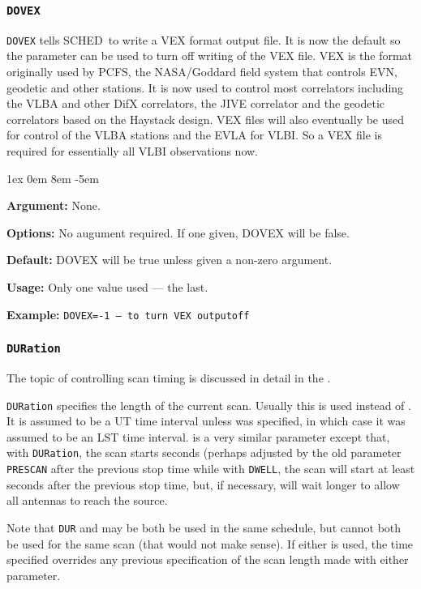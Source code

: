 \documentclass{report}
\newcommand{\schedb}{{\sc SCHED~}}
\newcommand{\rcwbox}[5]{
  \begin{list}{}{\parsep 1ex  \itemsep 0em
                 \leftmargin 8em  \itemindent -5em }
    \item {\bf Argument:} #1
    \item {\bf Options:}  #2
    \item {\bf Default:}  #3
    \item {\bf Usage:}    #4
    \item {\bf Example:}  #5
  \end{list}
}
\begin{document}
\subsubsection{\label{MP:DOVEX}{\tt DOVEX}}

{\tt DOVEX} tells \schedb to write a VEX format output file. It is now
the default so the parameter can be used to turn off writing of the
VEX file.  VEX is the format originally used by PCFS, the NASA/Goddard
field system that controls EVN, geodetic and other stations. It is now
used to control most correlators including the VLBA and other DifX
correlators, the JIVE correlator and the geodetic correlators based on
the Haystack design.  VEX files will also eventually be used for
control of the VLBA stations and the EVLA for VLBI.  So a VEX file is
required for essentially all VLBI observations now.


\rcwbox
{None.}
{No augument required.  If one given, DOVEX will be false.}
{DOVEX will be true unless given a non-zero argument.}
{Only one value used --- the last.}
{{\tt DOVEX=-1 --- to turn VEX outputoff}}


\subsubsection{\label{MP:DUR}{\tt DURation}}

The topic of controlling scan timing is discussed in detail in
the .

{\tt DURation} specifies the length of the current scan. Usually this
is used instead of . It is assumed to be
a UT time interval unless  was specified,
in which case it was assumed to be an LST time interval.
 is a very similar parameter except
that, with {\tt DURation}, the scan starts 
seconds (perhaps adjusted by the old parameter {\tt PRESCAN} after the
previous stop time while with {\tt DWELL}, the scan will start at least
 seconds after the previous stop time, but,
if necessary, will wait longer to allow all antennas to reach the
source.

Note that {\tt DUR} and 
may be both be used in the same schedule, but cannot both be used
for the same scan (that would not make sense).  If either is used,
the time specified overrides any previous specification of the
scan length made with either parameter.
\end{document}
